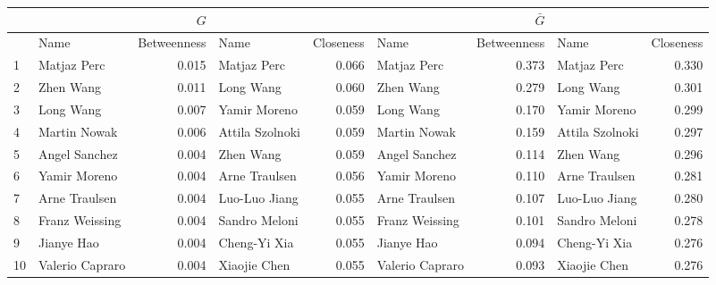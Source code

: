\begin{tabular}{llrlr|lrlr}
\toprule
& \multicolumn{4}{c}{$G$} & \multicolumn{4}{c}{$\bar{G}$} \\
\midrule
{} &             Name &  Betweenness &             Name &  Closeness &             Name &  Betweenness &             Name &  Closeness \\
\midrule
1  &      Matjaz Perc &        0.015 &      Matjaz Perc &      0.066 &      Matjaz Perc &        0.373 &      Matjaz Perc &      0.330 \\
2  &        Zhen Wang &        0.011 &        Long Wang &      0.060 &        Zhen Wang &        0.279 &        Long Wang &      0.301 \\
3  &        Long Wang &        0.007 &     Yamir Moreno &      0.059 &        Long Wang &        0.170 &     Yamir Moreno &      0.299 \\
4  &     Martin Nowak &        0.006 &  Attila Szolnoki &      0.059 &     Martin Nowak &        0.159 &  Attila Szolnoki &      0.297 \\
5  &    Angel Sanchez &        0.004 &        Zhen Wang &      0.059 &    Angel Sanchez &        0.114 &        Zhen Wang &      0.296 \\
6  &     Yamir Moreno &        0.004 &    Arne Traulsen &      0.056 &     Yamir Moreno &        0.110 &    Arne Traulsen &      0.281 \\
7  &    Arne Traulsen &        0.004 &    Luo-Luo Jiang &      0.055 &    Arne Traulsen &        0.107 &    Luo-Luo Jiang &      0.280 \\
8  &   Franz Weissing &        0.004 &    Sandro Meloni &      0.055 &   Franz Weissing &        0.101 &    Sandro Meloni &      0.278 \\
9  &       Jianye Hao &        0.004 &     Cheng-Yi Xia &      0.055 &       Jianye Hao &        0.094 &     Cheng-Yi Xia &      0.276 \\
10 &  Valerio Capraro &        0.004 &     Xiaojie Chen &      0.055 &  Valerio Capraro &        0.093 &     Xiaojie Chen &      0.276 \\
\bottomrule
\end{tabular}
